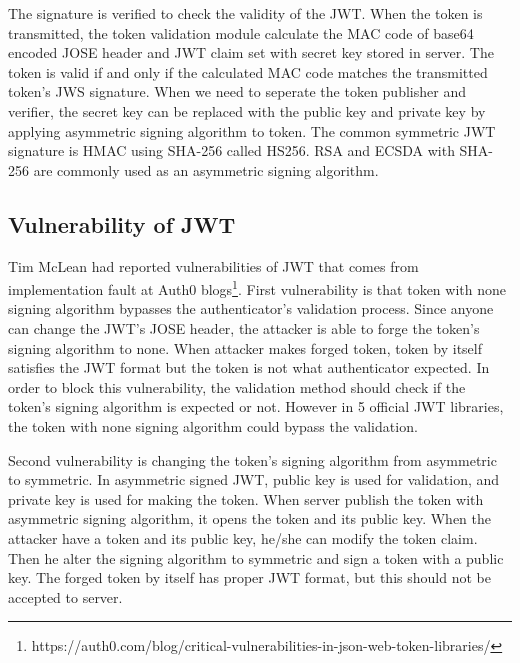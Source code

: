 \documentclass[journal,article,submit,moreauthors,pdftex,10pt,a4paper]{mdpi}
\begin{document}
The signature is verified to check the validity of the JWT. When the token is transmitted, the token validation module calculate the MAC code of base64 encoded JOSE header and JWT claim set with secret key stored in server. The token is valid if and only if the calculated MAC code matches the transmitted token's JWS signature. When we need to seperate the token publisher and verifier, the secret key can be replaced with the public key and private key by applying asymmetric signing algorithm to token. The common symmetric JWT signature is HMAC using SHA-256 called HS256. RSA and ECSDA with SHA-256 are commonly used as an asymmetric signing algorithm.

\subsection{Vulnerability of JWT}

Tim McLean had reported vulnerabilities of JWT that comes from implementation fault at Auth0 blogs\footnote{https://auth0.com/blog/critical-vulnerabilities-in-json-web-token-libraries/}. First vulnerability is that token with none signing algorithm bypasses the authenticator's validation process. Since anyone can change the JWT's JOSE header, the attacker is able to forge the token's signing algorithm to none. When attacker makes forged token, token by itself satisfies the JWT format but the token is not what authenticator expected. In order to block this vulnerability, the validation method should check if the token's signing algorithm is expected or not. However in 5 official JWT libraries, the token with none signing algorithm could bypass the validation.

Second vulnerability is changing the token's signing algorithm from asymmetric to symmetric. In asymmetric signed JWT, public key is used for validation, and private key is used for making the token. When server publish the token with asymmetric signing algorithm, it opens the token and its public key. When the attacker have a token and its public key, he/she can modify the token claim. Then he alter the signing algorithm to symmetric and sign a token with a public key. The forged token by itself has proper JWT format, but this should not be accepted to server.
\end{document}
